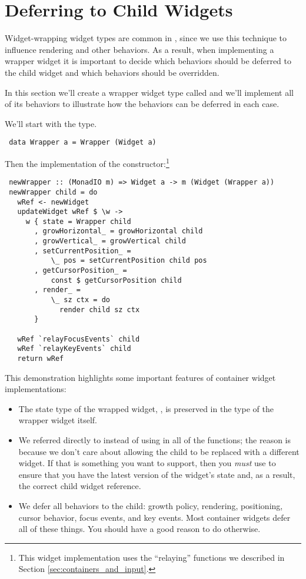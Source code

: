 \section{Deferring to Child Widgets}
\label{sec:deferring}

Widget-wrapping widget types are common in , since we use
this technique to influence rendering and other behaviors.  As a
result, when implementing a wrapper widget it is important to decide
which behaviors should be deferred to the child widget and which
behaviors should be overridden.

In this section we'll create a wrapper widget type called 
and we'll implement all of its behaviors to illustrate how the
behaviors can be deferred in each case.

We'll start with the type.

\begin{verbatim}
 data Wrapper a = Wrapper (Widget a)
\end{verbatim}

Then the implementation of the constructor:\footnote{This widget
  implementation uses the ``relaying'' functions we described in
  Section \ref{sec:containers_and_input}.}

\begin{verbatim}
 newWrapper :: (MonadIO m) => Widget a -> m (Widget (Wrapper a))
 newWrapper child = do
   wRef <- newWidget
   updateWidget wRef $ \w ->
     w { state = Wrapper child
       , growHorizontal_ = growHorizontal child
       , growVertical_ = growVertical child
       , setCurrentPosition_ =
           \_ pos = setCurrentPosition child pos
       , getCursorPosition_ =
           const $ getCursorPosition child
       , render_ =
           \_ sz ctx = do
             render child sz ctx
       }

   wRef `relayFocusEvents` child
   wRef `relayKeyEvents` child
   return wRef
\end{verbatim}

This demonstration highlights some important features of container
widget implementations:

\begin{itemize}
\item The state type of the wrapped widget, , is preserved in
  the type of the wrapper widget itself.
\item We referred directly to  instead of using
   in all of the functions; the reason is because we
  don't care about allowing the child to be replaced with a different
  widget.  If that is something you want to support, then you
  \textit{must} use  to ensure that you have the latest
  version of the widget's state and, as a result, the correct child
  widget reference.
\item We defer all behaviors to the child: growth policy, rendering,
  positioning, cursor behavior, focus events, and key events.  Most
  container widgets defer all of these things.  You should have a good
  reason to do otherwise.
\end{itemize}

